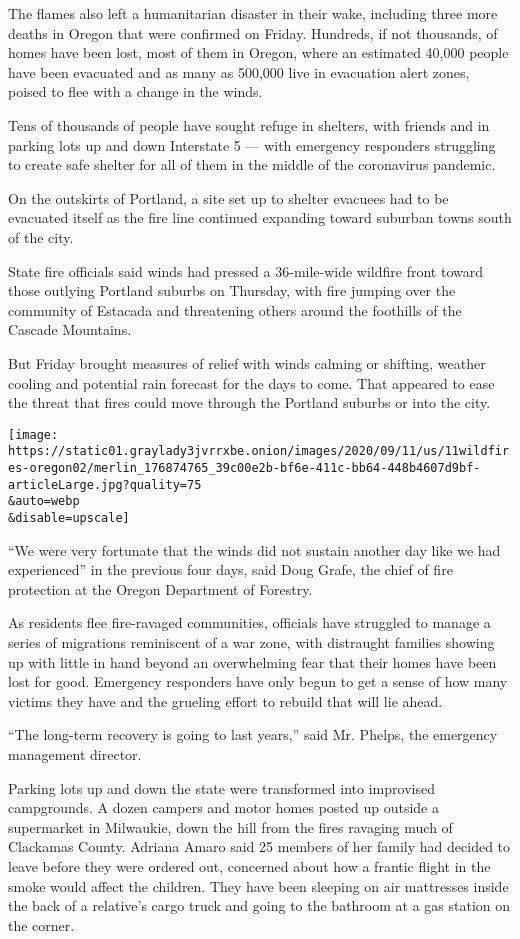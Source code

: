 The flames also left a humanitarian disaster in their wake, including
three more deaths in Oregon that were confirmed on Friday. Hundreds, if
not thousands, of homes have been lost, most of them in Oregon, where an
estimated 40,000 people have been evacuated and as many as 500,000 live
in evacuation alert zones, poised to flee with a change in the winds.

Tens of thousands of people have sought refuge in shelters, with friends
and in parking lots up and down Interstate 5 --- with emergency
responders struggling to create safe shelter for all of them in the
middle of the coronavirus pandemic.

On the outskirts of Portland, a site set up to shelter evacuees had to
be evacuated itself as the fire line continued expanding toward suburban
towns south of the city.

State fire officials said winds had pressed a 36-mile-wide wildfire
front toward those outlying Portland suburbs on Thursday, with fire
jumping over the community of Estacada and threatening others around the
foothills of the Cascade Mountains.

But Friday brought measures of relief with winds calming or shifting,
weather cooling and potential rain forecast for the days to come. That
appeared to ease the threat that fires could move through the Portland
suburbs or into the city.

\texttt{[image: https://static01.graylady3jvrrxbe.onion/images/2020/09/11/us/11wildfires-oregon02/merlin\_176874765\_39c00e2b-bf6e-411c-bb64-448b4607d9bf-articleLarge.jpg?quality=75\\\&auto=webp\\\&disable=upscale]}

``We were very fortunate that the winds did not sustain another day like
we had experienced'' in the previous four days, said Doug Grafe, the
chief of fire protection at the Oregon Department of Forestry.

As residents flee fire-ravaged communities, officials have struggled to
manage a series of migrations reminiscent of a war zone, with distraught
families showing up with little in hand beyond an overwhelming fear that
their homes have been lost for good. Emergency responders have only
begun to get a sense of how many victims they have and the grueling
effort to rebuild that will lie ahead.

``The long-term recovery is going to last years,'' said Mr. Phelps, the
emergency management director.

Parking lots up and down the state were transformed into improvised
campgrounds. A dozen campers and motor homes posted up outside a
supermarket in Milwaukie, down the hill from the fires ravaging much of
Clackamas County. Adriana Amaro said 25 members of her family had
decided to leave before they were ordered out, concerned about how a
frantic flight in the smoke would affect the children. They have been
sleeping on air mattresses inside the back of a relative's cargo truck
and going to the bathroom at a gas station on the corner.

